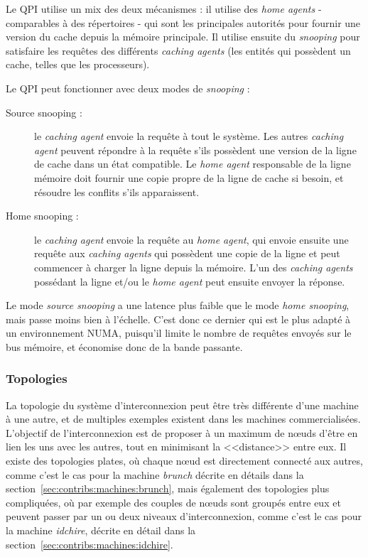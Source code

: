 Le QPI utilise un mix des deux mécanismes : il utilise des \emph{home agents} - comparables à des répertoires - qui sont les principales autorités pour fournir une version du cache depuis la mémoire principale.
Il utilise ensuite du \emph{snooping} pour satisfaire les requêtes des différents \emph{caching agents} (les entités qui possèdent un cache, telles que les processeurs).

Le QPI peut fonctionner avec deux modes de \emph{snooping} :
\begin{description}
  \item [Source snooping :] le \emph{caching agent} envoie la requête à tout le système. Les autres \emph{caching agent} peuvent répondre à la requête s'ils possèdent une version de la ligne de cache dans un état compatible. Le \emph{home agent} responsable de la ligne mémoire doit fournir une copie propre de la ligne de cache si besoin, et résoudre les conflits s'ils apparaissent.
  \item [Home snooping :] le \emph{caching agent} envoie la requête au \emph{home agent}, qui envoie ensuite une requête aux \emph{caching agents} qui possèdent une copie de la ligne et peut commencer à charger la ligne depuis la mémoire. L'un des \emph{caching agents} possédant la ligne et/ou le \emph{home agent} peut ensuite envoyer la réponse.
\end{description}

Le mode \emph{source snooping} a une latence plus faible que le mode \emph{home snooping}, mais passe moins bien à l'échelle.
C'est donc ce dernier qui est le plus adapté à un environnement NUMA, puisqu'il limite le nombre de requêtes envoyés sur le bus mémoire, et économise donc de la bande passante.


\subsubsection{Topologies}

La topologie du système d'interconnexion peut être très différente d'une machine à une autre, et de multiples exemples existent dans les machines commercialisées.
L'objectif de l'interconnexion est de proposer à un maximum de nœuds d'être en lien les uns avec les autres, tout en minimisant la <<distance>> entre eux.
Il existe des topologies plates, où chaque nœud est directement connecté aux autres, comme c'est le cas pour la machine \emph{brunch} décrite en détails dans la section~\ref{sec:contribs:machines:brunch}, mais également des topologies plus compliquées, où par exemple des couples de nœuds sont groupés entre eux et peuvent passer par un ou deux niveaux d'interconnexion, comme c'est le cas pour la machine \emph{idchire}, décrite en détail dans la section~\ref{sec:contribs:machines:idchire}.

